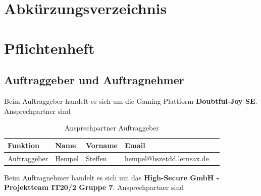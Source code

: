 \documentclass[a4paper,
    11pt,
    headings=small,
    ngerman,
    listof=totoc,
    numbers=noenddot]{scrreprt}[2021/11/13]
\begin{document}
\tableofcontents

\newpage

\chapter*{Abkürzungsverzeichnis}

\begin{acronym}[DHCP]
\end{acronym}

\newpage
\pagestyle{scrheadings}
\ihead{\rightmark}


\chapter{Pflichtenheft}

\section{Auftraggeber und Auftragnehmer }

Beim Auftraggeber handelt es sich um die Gaming-Plattform \textbf{Doubtful-Joy SE}. Ansprechpartner sind

\begin{table}[htbp]
  \centering
  \renewcommand{\arraystretch}{1.25}
  \caption{Ansprechpartner Auftraggeber}
  \begin{tabular}{lllll}
    Funktion     & Name   & Vorname & Email                                 \\
    \hline
    Auftraggeber & Hempel & Steffen & \flq{}hempel@bszetdd.lernsax.de\frq{} \\
  \end{tabular}
  \label{tab:Auftraggeber}
\end{table}

Beim Auftragnehmer handelt es sich um das \textbf{High-Secure GmbH - Projektteam IT20/2 Gruppe 7}. Ansprechpartner sind
\end{document}
